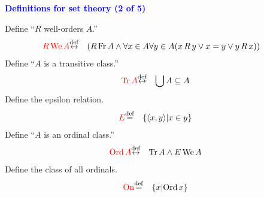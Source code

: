 \documentclass{slides}
\begin{document}
\begin{slide}

\begin{center}
\textcolor{blue}{\textbf{Definitions for set theory (2 of 5)}}
\end{center}

Define ``$R$ well-orders $A$.''
\begin{eqnarray}
\textcolor{red}{ R \,{\rm We}\, A} & {\buildrel\rm def\over \leftrightarrow} &
( R \,{\rm Fr}\, A \wedge \forall x \in A
\forall y \in A ( x \,R \,y \vee x = y \vee y \,R \,x ) )\ \ \ \label{dfwe2}
\end{eqnarray}
Define ``$A$ is a transitive class.''
\begin{eqnarray}
\textcolor{red}{ {\rm Tr}\, A} &
 {\buildrel\rm def\over \leftrightarrow} & \bigcup A \subseteq A  \label{df-tr}
\end{eqnarray}
Define the epsilon relation.
\begin{eqnarray}
\textcolor{red}{E} & {\buildrel\rm def\over =} &  \{ \langle x , y \rangle | x \in y \}
\label{df-eprel}
\end{eqnarray}
Define ``$A$ is an ordinal class.''
\begin{eqnarray}
\textcolor{red}{ {\rm Ord}\, A} & {\buildrel\rm def\over \leftrightarrow} &
 {\rm Tr}\, A \wedge E\, {\rm We}\, A  \label{df-ord}
\end{eqnarray}
Define the class of all ordinals.
\begin{eqnarray}
\textcolor{red}{{\rm On}} & {\buildrel\rm def\over =} &
 \{ x | {\rm Ord}\, x \}  \label{df-on}
\end{eqnarray}

\end{slide}
\end{document}
